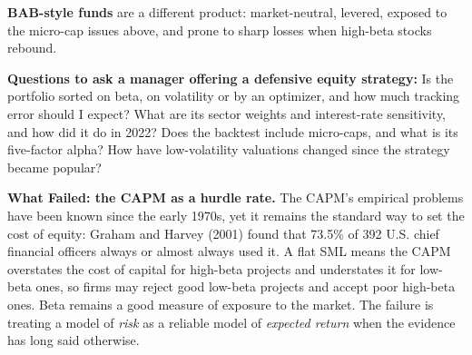 \textbf{BAB-style funds} are a different product: market-neutral, levered, exposed to the micro-cap issues above, and prone to sharp losses when high-beta stocks rebound.

\textbf{Questions to ask a manager offering a defensive equity strategy:} Is the portfolio sorted on beta, on volatility or by an optimizer, and how much tracking error should I expect? What are its sector weights and interest-rate sensitivity, and how did it do in 2022? Does the backtest include micro-caps, and what is its five-factor alpha? How have low-volatility valuations changed since the strategy became popular?

\begin{callout}
\textbf{What Failed: the CAPM as a hurdle rate.} The CAPM's empirical problems have been known since the early 1970s, yet it remains the standard way to set the cost of equity: Graham and Harvey (2001) found that 73.5\% of 392 U.S. chief financial officers always or almost always used it. A flat SML means the CAPM overstates the cost of capital for high-beta projects and understates it for low-beta ones, so firms may reject good low-beta projects and accept poor high-beta ones. Beta remains a good measure of exposure to the market. The failure is treating a model of \emph{risk} as a reliable model of \emph{expected return} when the evidence has long said otherwise.
\end{callout}
